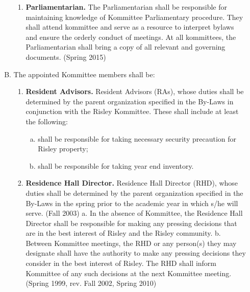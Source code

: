 \documentclass[12pt]{article}
\begin{document}
\begin{enumerate}[A.]
\begin{enumerate}[A.]
\begin{enumerate}[1.]
\item \textbf{Parliamentarian.} The Parliamentarian shall be responsible for maintaining knowledge of Kommittee Parliamentary procedure. They shall attend kommittee and serve as a resource to interpret bylaws and ensure the orderly conduct of meetings. At all kommittees, the Parliamentarian shall bring a copy of all relevant and governing documents. (Spring 2015)
\end{enumerate}
\item The appointed Kommittee members shall be:
\begin{enumerate}[1.]
\item \textbf{Resident Advisors.} Resident Advisors (RAs), whose duties shall be determined by the parent organization specified in the By-Laws in conjunction with the Risley Kommittee. These shall include at least the following:
\begin{enumerate}[a.]
\item shall be responsible for taking necessary security precaution for Risley property;
\item shall be responsible for taking year end inventory.
\end{enumerate}
\item \textbf{Residence Hall Director.} Residence Hall Director (RHD), whose duties shall be determined by the parent organization specified in the By-Laws in the spring prior to the academic year in which s/he will serve. (Fall 2003) a. In the absence of Kommittee, the Residence Hall Director shall be responsible for making any pressing decisions that are in the best interest of Risley and the Risley community. b. Between Kommittee meetings, the RHD or any person(s) they may designate shall have the authority to make any pressing decisions they consider in the best interest of Risley. The RHD shall inform Kommittee of any such decisions at the next Kommittee meeting. (Spring 1999, rev. Fall 2002, Spring 2010)


\end{enumerate}
\end{enumerate}
\end{enumerate}
\end{document}
